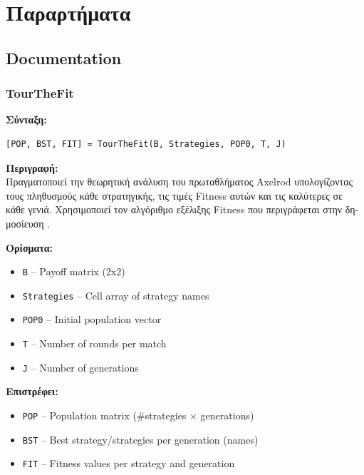 \documentclass[12pt]{report}
\begin{document}
\chapter{Παραρτήματα}


\section{\foreignlanguage{english}{Documentation}
\label{documentation}}


\subsection*{TourTheFit}

\textbf{\foreignlanguage{greek}{Σύνταξη}:}
\begin{verbatim}
[POP, BST, FIT] = TourTheFit(B, Strategies, POP0, T, J)
\end{verbatim}

\textbf{\foreignlanguage{greek}{Περιγραφή:}} \\
\foreignlanguage{greek}{
Πραγματοποιεί την θεωρητική ανάλυση του πρωταθλήματος \foreignlanguage{english}{Axelrod} υπολογίζοντας τους πληθυσμούς κάθε στρατηγικής, τις τιμές \foreignlanguage{english}{Fitness} αυτών και τις καλύτερες σε κάθε γενιά. Χρησιμοποιεί τον αλγόριθμο εξέλιξης \foreignlanguage{english}{Fitness} που περιγράφεται στην δημοσίευση \cite{mathieu1999}.}

\textbf{\foreignlanguage{greek}{Ορίσματα:}}
\begin{itemize}
    \item \texttt{B} – Payoff matrix (2x2)
    \item \texttt{Strategies} – Cell array of strategy names
    \item \texttt{POP0} – Initial population vector
    \item \texttt{T} – Number of rounds per match
    \item \texttt{J} – Number of generations
\end{itemize}

\textbf{\foreignlanguage{greek}{Επιστρέφει}:}
\begin{itemize}
    \item \texttt{POP} – Population matrix (\#strategies × generations)
    \item \texttt{BST} – Best strategy/strategies per generation (names)
    \item \texttt{FIT} – Fitness values per strategy and generation
\end{itemize}
\end{document}
